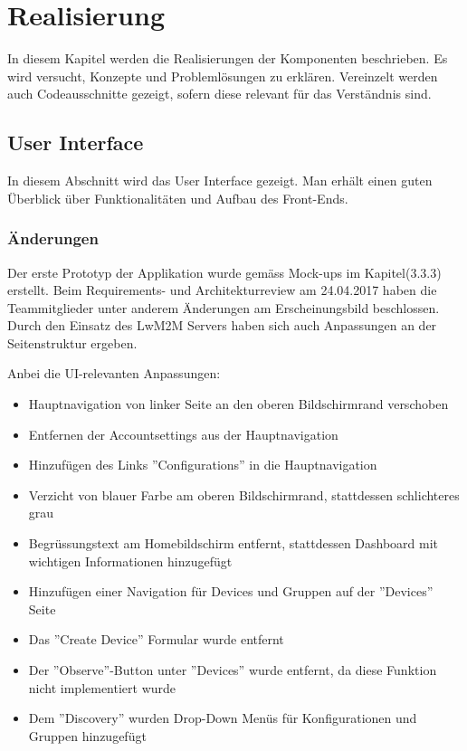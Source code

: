 \chapter{Realisierung}
In diesem Kapitel werden die Realisierungen der Komponenten beschrieben. Es wird versucht, Konzepte und Problemlösungen zu erklären. Vereinzelt werden auch Codeausschnitte gezeigt, sofern diese relevant für das Verständnis sind.

\section{User Interface}
In diesem Abschnitt wird das User Interface gezeigt. Man erhält einen guten Überblick über Funktionalitäten und Aufbau des Front-Ends.
\subsection{Änderungen}
Der erste Prototyp der Applikation wurde gemäss Mock-ups im Kapitel(3.3.3) erstellt. Beim Requirements- und Architekturreview am 24.04.2017 haben die Teammitglieder unter anderem Änderungen am Erscheinungsbild beschlossen. Durch den Einsatz des LwM2M Servers haben sich auch Anpassungen an der Seitenstruktur ergeben.

Anbei die UI-relevanten Anpassungen:
\begin{itemize}
\item Hauptnavigation von linker Seite an den oberen Bildschirmrand verschoben
\item Entfernen der Accountsettings aus der Hauptnavigation
\item Hinzufügen des Links ''Configurations'' in die Hauptnavigation
\item Verzicht von blauer Farbe am oberen Bildschirmrand, stattdessen schlichteres grau
\item Begrüssungstext am Homebildschirm entfernt, stattdessen Dashboard mit wichtigen Informationen hinzugefügt
\item Hinzufügen einer Navigation für Devices und Gruppen auf der ''Devices'' Seite
\item Das ''Create Device'' Formular wurde entfernt
\item Der ''Observe''-Button unter ''Devices'' wurde entfernt, da diese Funktion nicht implementiert wurde
\item Dem ''Discovery'' wurden Drop-Down Menüs für Konfigurationen und Gruppen hinzugefügt
\end{itemize}

